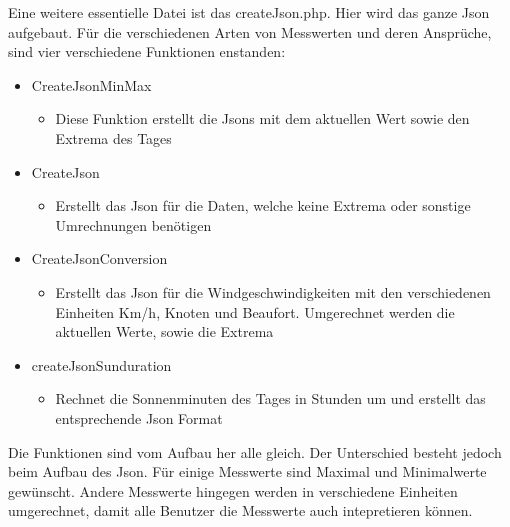Eine weitere essentielle Datei ist das createJson.php. Hier wird das ganze Json aufgebaut. Für die verschiedenen Arten von Messwerten und deren Ansprüche, sind vier verschiedene Funktionen enstanden:

\begin{itemize}
\item CreateJsonMinMax
\begin{itemize}
\item Diese Funktion erstellt die Jsons mit dem aktuellen Wert sowie den Extrema des Tages
\end{itemize}
\item CreateJson
\begin{itemize}
\item Erstellt das Json für die Daten, welche keine Extrema oder sonstige Umrechnungen benötigen
\end{itemize}
\item CreateJsonConversion
\begin{itemize}
\item Erstellt das Json für die Windgeschwindigkeiten mit den verschiedenen Einheiten Km/h, Knoten und Beaufort. Umgerechnet werden die aktuellen Werte, sowie die Extrema
\end{itemize}
\item createJsonSunduration
\begin{itemize}
\item Rechnet die Sonnenminuten des Tages in Stunden um und erstellt das entsprechende Json Format
\end{itemize}
\end{itemize}

Die Funktionen sind vom Aufbau her alle gleich. Der Unterschied besteht jedoch beim Aufbau des Json. Für einige Messwerte sind Maximal und Minimalwerte gewünscht. Andere Messwerte hingegen werden in verschiedene Einheiten umgerechnet, damit alle Benutzer die Messwerte auch intepretieren können.
